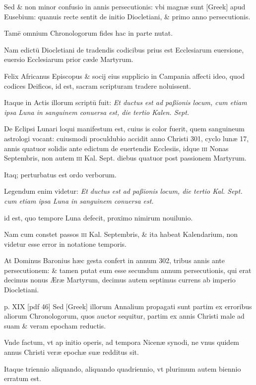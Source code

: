 \begin{parnumbers}
Sed \& non minor confusio in annis persecutionis:
vbi magnæ sunt \textgreek{[Greek]} apud Eusebium: quanuis
recte sentit de initio Diocletiani, \& primo anno persecutionis.

Tamē
omnium Chronologorum fides hac in parte nutat.

Nam edictū
Diocletiani de tradendis codicibus prius est Ecclesiarum euersione,
euersio Ecclesiarum prior cæde Martyrum.

Felix Africanus Episcopus
\& socij eius supplicio in Campania affecti ideo, quod codices
Deificos, id est, sacram scripturam tradere noluissent.

Itaque in
Actis illorum scriptū fuit: \textit{Et ductus est ad paßionis locum, cum etiam
ipsa Luna in sanguinem conuersa est, die tertio Kalen. Sept.}

De Eclipsi
Lunari loqui manifestum est, cuius is color fuerit, quem sanguineum
astrologi vocant: cuiusmodi proculdubio accidit anno Christi
301, cyclo lunæ 17, annis quatuor solidis ante edictum de euertendis
Ecclesiis, idque \textsc{iii} Nonas Septembris, non autem \textsc{iii} Kal.
Sept. diebus quatuor post passionem Martyrum.

Itaq; perturbatus
est ordo verborum.

Legendum enim videtur: \textit{Et ductus est ad paßionis
locum, die tertio Kal. Sept. cum etiam ipsa Luna in sanguinem conuersa
est.}

id est, quo tempore Luna defecit, proximo nimirum nouilunio.

Nam cum constet passos \textsc{iii} Kal. Septembris, \& ita habeat
Kalendarium, non videtur esse error in notatione temporis.

At Dominus Baronius hæc gesta confert in annum 302, tribus annis ante
persecutionem: \& tamen putat eum esse secundum annum persecutionis,
qui erat decimus nonus Æræ Martyrum, decimus autem
septimus currens ab imperio Diocletiani.

\clearpage
p. XIX [pdf 46]
Sed \textgreek{[Greek]} illorum
Annalium propagati sunt partim ex erroribus aliorum Chronologorum,
quos auctor sequitur, partim ex annis Christi male ad
suam \& veram epocham reductis.

Vnde factum, vt ap initio operis,
ad tempora Nicenæ synodi, ne vnus quidem annus Christi
veræ epochæ suæ redditus sit.

Itaque triennio aliquando, aliquando
quadriennio, vt plurimum autem biennio erratum est.


\end{parnumbers}
